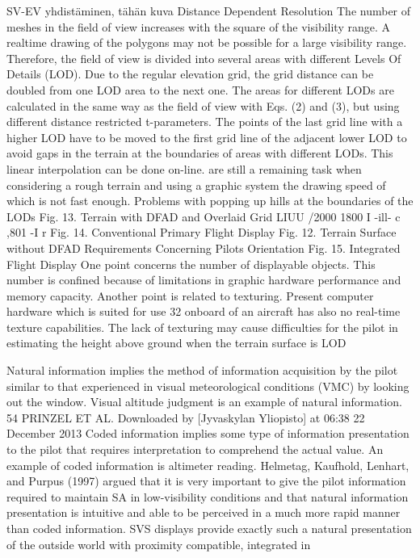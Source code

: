 \documentclass[utf8,bachelor,manualbib]{gradu3}
\begin{document}
SV-EV yhdistäminen, tähän kuva \citep{mollersachs1994}
Distance Dependent Resolution
The number of meshes in the field of view increases with
the square of the visibility range. A realtime drawing of the
polygons may not be possible for a large visibility range.
Therefore, the field of view is divided into several areas with
different Levels Of Details (LOD). Due to the regular elevation
grid, the grid distance can be doubled from one LOD area to
the next one. The areas for different LODs are calculated in
the same way as the field of view with Eqs. (2) and (3), but
using different distance restricted t-parameters. The points of
the last grid line with a higher LOD have to be moved to the
first grid line of the adjacent lower LOD to avoid gaps in the
terrain at the boundaries of areas with different LODs. This
linear interpolation can be done on-line.
are still a remaining task when considering a rough terrain and
using a graphic system the drawing speed of which is not fast
enough.
Problems with popping up hills at the boundaries of the LODs
Fig. 13. Terrain with DFAD and Overlaid Grid
LIUU
/2000
1800
I -ill- c
,801
-I r
Fig. 14. Conventional Primary Flight Display
Fig. 12. Terrain Surface without DFAD
Requirements Concerning Pilots Orientation
Fig. 15. Integrated Flight Display
One point concerns the number of displayable objects. This
number is confined because of limitations in graphic hardware
performance and memory capacity. Another point is related to
texturing. Present computer hardware which is suited for use
32
onboard of an aircraft has also no real-time texture capabilities.
The lack of texturing may cause difficulties for the pilot in
estimating the height above ground when the terrain surface is
LOD \citep{mollersachs1994}

Natural information implies the method of information acquisition by the pilot
similar to that experienced in visual meteorological conditions (VMC) by looking
out the window. Visual altitude judgment is an example of natural information.
54 PRINZEL ET AL.
Downloaded by [Jyvaskylan Yliopisto] at 06:38 22 December 2013
Coded information implies some type of information presentation to the pilot that
requires interpretation to comprehend the actual value. An example of coded information
is altimeter reading. Helmetag, Kaufhold, Lenhart, and Purpus (1997) argued
that it is very important to give the pilot information required to maintain SA
in low-visibility conditions and that natural information presentation is intuitive
and able to be perceived in a much more rapid manner than coded information.
SVS displays provide exactly such a natural presentation of the outside world with
proximity compatible, integrated in \citep{prinzel2004}
\end{document}
